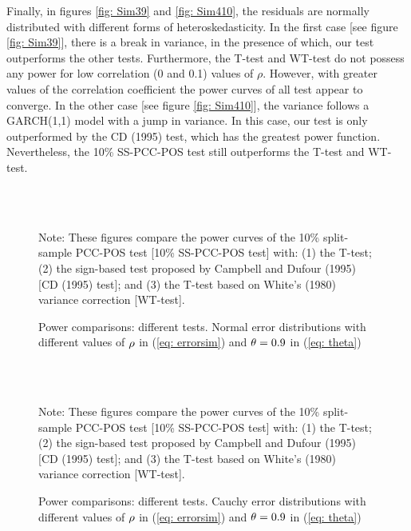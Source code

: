 \documentclass[harvard,11pt]{article}
\begin{document}
Finally, in figures \ref{fig: Sim39} and \ref{fig: Sim410}, the residuals are normally distributed with different forms of heteroskedasticity. In the first case [see figure \ref{fig: Sim39}], there is a break in variance, in the presence of which, our test outperforms the other tests. Furthermore, the T-test and WT-test do not possess any power for low correlation (0 and 0.1) values of $\rho$. However, with greater values of the correlation coefficient the power curves of all test appear to converge. In the other case [see figure \ref{fig: Sim410}], the variance follows a GARCH(1,1) model with a jump in variance. In this case, our test is only outperformed by the CD (1995) test, which has the greatest power function. Nevertheless, the 10\% SS-PCC-POS test still outperforms the T-test and WT-test.  
\begin{figure}[tbph]
\caption{Power comparisons: different tests. Normal error distributions with
different values of $\protect\rho $ in (\protect\ref{eq: errorsim}) and $\protect%
\theta =0.9$ in (\protect\ref{eq: theta})}
\begin{center}
 \\[0pt]
\\[0pt]
\end{center}
\doublespacing
Note: These figures compare the power curves of the 10\% split-sample PCC-POS test
[10\% SS-PCC-POS test] with: (1) the T-test; (2) the sign-based test
proposed by Campbell and Dufour (1995) [CD (1995) test]; and (3) the T-test based
on White's (1980) variance correction [WT-test]. 
\label{fig: Sim17}
\end{figure}


\begin{figure}[tbph]
\caption{Power comparisons: different tests. Cauchy error distributions with
different values of $\protect\rho $ in (\protect\ref{eq: errorsim}) and $\protect%
\theta =0.9$ in (\protect\ref{eq: theta})}
\begin{center}
 \\[0pt]
\\[0pt]
\end{center}
\doublespacing
 Note: These figures compare the power curves of the 10\% split-sample PCC-POS test
[10\% SS-PCC-POS test] with: (1) the T-test; (2) the sign-based test
proposed by Campbell and Dufour (1995) [CD (1995) test]; and (3) the T-test based
on White's (1980) variance correction [WT-test]. 
\label{fig: Sim28}
\end{figure}
\end{document}

